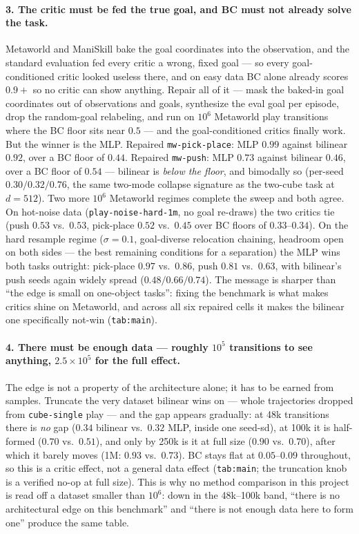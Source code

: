 \documentclass[10pt]{article}
\begin{document}
\paragraph{3. The critic must be fed the true goal, and BC must not already solve the
task.}
Metaworld and ManiSkill bake the goal coordinates into the observation, and the standard
evaluation fed every critic a wrong, fixed goal --- so every goal-conditioned critic
looked useless there, and on easy data BC alone already scores $0.9{+}$ so no critic can
show anything. Repair all of it --- mask the baked-in goal coordinates out of
observations and goals, synthesize the eval goal per episode, drop the random-goal
relabeling, and run on $10^6$ Metaworld play transitions where the BC floor sits near
$0.5$ --- and the goal-conditioned critics finally work. But the winner is the MLP.
Repaired \texttt{mw-pick-place}: MLP $0.99$ against bilinear $0.92$, over a BC floor of
$0.44$. Repaired \texttt{mw-push}: MLP $0.73$ against bilinear $0.46$, over a BC floor of
$0.54$ --- bilinear is \emph{below the floor}, and bimodally so (per-seed $0.30/0.32/0.76$,
the same two-mode collapse signature as the two-cube task at $d{=}512$). Two more $10^6$
Metaworld regimes complete the sweep and both agree. On hot-noise data
(\texttt{play-noise-hard-1m}, no goal re-draws) the two critics tie
(push $0.53$ vs.\ $0.53$, pick-place $0.52$ vs.\ $0.45$ over BC floors of $0.33$--$0.34$).
On the hard resample regime ($\sigma{=}0.1$, goal-diverse relocation chaining, headroom
open on both sides --- the best remaining conditions for a separation) the MLP wins both
tasks outright: pick-place $0.97$ vs.\ $0.86$, push $0.81$ vs.\ $0.63$, with bilinear's
push seeds again widely spread ($0.48/0.66/0.74$). The message is sharper than ``the edge
is small on one-object tasks'': fixing the benchmark is what makes critics shine on
Metaworld, and across all six repaired cells it makes the bilinear one specifically
not-win (\texttt{tab:main}).

\paragraph{4. There must be enough data --- roughly $10^5$ transitions to see anything,
$2.5\times10^5$ for the full effect.}
The edge is not a property of the architecture alone; it has to be earned from samples.
Truncate the very dataset bilinear wins on --- whole trajectories dropped from
\texttt{cube-single} play --- and the gap appears gradually: at 48k transitions there is
\emph{no} gap ($0.34$ bilinear vs.\ $0.32$ MLP, inside one seed-sd), at 100k it is
half-formed ($0.70$ vs.\ $0.51$), and only by 250k is it at full size ($0.90$ vs.\ $0.70$),
after which it barely moves (1M: $0.93$ vs.\ $0.73$). BC stays flat at $0.05$--$0.09$
throughout, so this is a critic effect, not a general data effect
(\texttt{tab:main}; the truncation knob is a verified no-op at full size). This is why no
method comparison in this project is read off a dataset smaller than $10^6$: down in the
48k--100k band, ``there is no architectural edge on this benchmark'' and ``there is not
enough data here to form one'' produce the same table.
\end{document}
